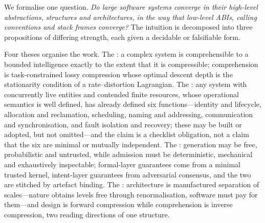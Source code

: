 \documentclass[UTF8,a4paper,11pt,openany,oneside]{ctexbook}
\begin{document}
We formalise one question. \emph{Do large software systems converge in their high-level
abstractions, structures and architectures, in the way that low-level ABIs, calling
conventions and stack frames converge?} The intuition is decomposed into three
propositions of differing strength, each given a decidable or falsifiable form.

Four theses organise the work. The : a complex system is
comprehensible to a bounded intelligence exactly to the extent that it is compressible;
comprehension is task-constrained lossy compression whose optimal descent depth is the
stationarity condition of a rate--distortion Lagrangian. The : any
system with concurrently live entities and contended finite resources, whose operational
semantics is well defined, has already defined six functions---identity and lifecycle,
allocation and reclamation, scheduling, naming and addressing, communication and
synchronisation, and fault isolation and recovery; these may be built or adopted, but not
omitted---and the claim is a checklist obligation, not a claim that the six are minimal or
mutually independent. The : generation may be free, probabilistic and
untrusted, while admission must be deterministic, mechanical and exhaustively inspectable;
formal-layer
guarantees come from a minimal trusted kernel, intent-layer guarantees from adversarial
consensus, and the two are stitched by artefact binding. The :
architecture is manufactured separation of scales---nature obtains levels free through
renormalisation, software must pay for them---and design is forward compression while
comprehension is inverse compression, two reading directions of one structure.
\end{document}
